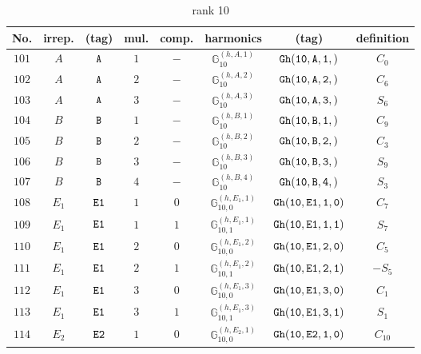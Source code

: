 \documentclass[fleqn,8pt]{jsarticle}
\begin{document}
\begin{table}[ht!]
\begin{center}
\caption{rank 10}
\renewcommand{\arraystretch}{1.3}
\begin{tabular}{cccccccc} \hline \hline
No. & irrep. & (tag) & mul. & comp. & harmonics & (tag) & definition \\ \hline
$ 101 $ & $ A $ & $ {\tt A} $ & $ 1 $ & $ - $ & $ \mathbb{G}_{10}^{(h,A,1)} $ & $ {\tt Gh(10,A,1,)} $ & $ C_{0} $ \\
$ 102 $ & $ A $ & $ {\tt A} $ & $ 2 $ & $ - $ & $ \mathbb{G}_{10}^{(h,A,2)} $ & $ {\tt Gh(10,A,2,)} $ & $ C_{6} $ \\
$ 103 $ & $ A $ & $ {\tt A} $ & $ 3 $ & $ - $ & $ \mathbb{G}_{10}^{(h,A,3)} $ & $ {\tt Gh(10,A,3,)} $ & $ S_{6} $ \\
$ 104 $ & $ B $ & $ {\tt B} $ & $ 1 $ & $ - $ & $ \mathbb{G}_{10}^{(h,B,1)} $ & $ {\tt Gh(10,B,1,)} $ & $ C_{9} $ \\
$ 105 $ & $ B $ & $ {\tt B} $ & $ 2 $ & $ - $ & $ \mathbb{G}_{10}^{(h,B,2)} $ & $ {\tt Gh(10,B,2,)} $ & $ C_{3} $ \\
$ 106 $ & $ B $ & $ {\tt B} $ & $ 3 $ & $ - $ & $ \mathbb{G}_{10}^{(h,B,3)} $ & $ {\tt Gh(10,B,3,)} $ & $ S_{9} $ \\
$ 107 $ & $ B $ & $ {\tt B} $ & $ 4 $ & $ - $ & $ \mathbb{G}_{10}^{(h,B,4)} $ & $ {\tt Gh(10,B,4,)} $ & $ S_{3} $ \\
$ 108 $ & $ E_{1} $ & $ {\tt E1} $ & $ 1 $ & $ 0 $ & $ \mathbb{G}_{10,0}^{(h,E_{1},1)} $ & $ {\tt Gh(10,E1,1,0)} $ & $ C_{7} $ \\
$ 109 $ & $ E_{1} $ & $ {\tt E1} $ & $ 1 $ & $ 1 $ & $ \mathbb{G}_{10,1}^{(h,E_{1},1)} $ & $ {\tt Gh(10,E1,1,1)} $ & $ S_{7} $ \\
$ 110 $ & $ E_{1} $ & $ {\tt E1} $ & $ 2 $ & $ 0 $ & $ \mathbb{G}_{10,0}^{(h,E_{1},2)} $ & $ {\tt Gh(10,E1,2,0)} $ & $ C_{5} $ \\
$ 111 $ & $ E_{1} $ & $ {\tt E1} $ & $ 2 $ & $ 1 $ & $ \mathbb{G}_{10,1}^{(h,E_{1},2)} $ & $ {\tt Gh(10,E1,2,1)} $ & $ - S_{5} $ \\
$ 112 $ & $ E_{1} $ & $ {\tt E1} $ & $ 3 $ & $ 0 $ & $ \mathbb{G}_{10,0}^{(h,E_{1},3)} $ & $ {\tt Gh(10,E1,3,0)} $ & $ C_{1} $ \\
$ 113 $ & $ E_{1} $ & $ {\tt E1} $ & $ 3 $ & $ 1 $ & $ \mathbb{G}_{10,1}^{(h,E_{1},3)} $ & $ {\tt Gh(10,E1,3,1)} $ & $ S_{1} $ \\
$ 114 $ & $ E_{2} $ & $ {\tt E2} $ & $ 1 $ & $ 0 $ & $ \mathbb{G}_{10,0}^{(h,E_{2},1)} $ & $ {\tt Gh(10,E2,1,0)} $ & $ C_{10} $ \\

\end{tabular}
\end{center}
\end{table}
\end{document}
